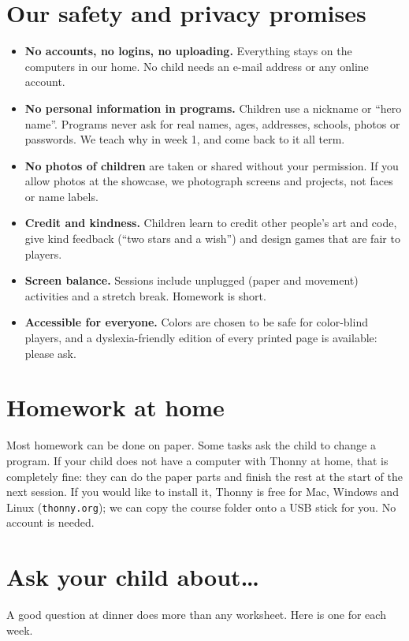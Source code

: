 \documentclass[level=2]{kidscode}
\begin{document}
\section{Our safety and privacy promises}
\begin{safety}
\begin{itemize}[itemsep=2pt]
  \item \textbf{No accounts, no logins, no uploading.} Everything stays on the computers in our home.
        No child needs an e-mail address or any online account.
  \item \textbf{No personal information in programs.} Children use a nickname or \enquote{hero name}.
        Programs never ask for real names, ages, addresses, schools, photos or passwords. We teach
        why in week 1, and come back to it all term.
  \item \textbf{No photos of children} are taken or shared without your permission. If you allow
        photos at the showcase, we photograph screens and projects, not faces or name labels.
  \item \textbf{Credit and kindness.} Children learn to credit other people's art and code, give
        kind feedback (\enquote{two stars and a wish}) and design games that are fair to players.
  \item \textbf{Screen balance.} Sessions include unplugged (paper and movement) activities and a
        stretch break. Homework is short.
  \item \textbf{Accessible for everyone.} Colors are chosen to be safe for color-blind players,
        and a dyslexia-friendly edition of every printed page is available: please ask.
\end{itemize}
\end{safety}

\section{Homework at home}
Most homework can be done on paper. Some tasks ask the child to change a program. If your child
does not have a computer with Thonny at home, that is completely fine: they can do the paper parts
and finish the rest at the start of the next session. If you would like to install it, Thonny is
free for Mac, Windows and Linux (\texttt{thonny.org}); we can copy the course folder onto a USB
stick for you. No account is needed.

\section{Ask your child about\ldots}
A good question at dinner does more than any worksheet. Here is one for each week.
\end{document}
